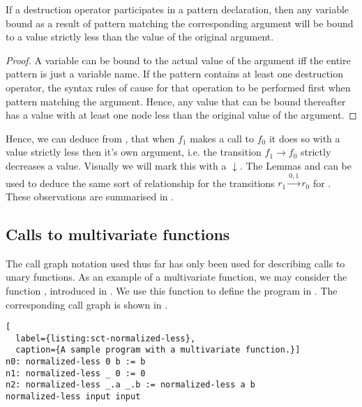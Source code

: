 \begin{lemma}\label{lemma:d-pattern-less} If a destruction operator
participates in a pattern declaration, then any variable bound as a result of
pattern matching the corresponding argument will be bound to a value strictly
less than the value of the original argument.\end{lemma}

\begin{proof} A variable can be bound to the actual value of the argument iff
the entire pattern is just a variable name. If the pattern contains at least
one destruction operator, the syntax rules of \D{} cause for that operation to
be performed first when pattern matching the argument. Hence, any value that
can be bound thereafter has a value with at least one node less than the
original value of the argument. \end{proof}

Hence, we can deduce from , that when $f_1$ makes a
call to $f_0$ it does so with a value strictly less then it's own argument,
i.e. the transition $f_1\rightarrow f_0$ strictly decreases a value. Visually
we will mark this with a $\downarrow$. The Lemmas 
and  can be used to deduce the same sort of
relationship for the transitions $r_1\xrightarrow{0,1} r_0$ for
. These observations are summarised in
.



\subsection{Calls to multivariate functions}

The call graph notation used thus far has only been used for describing calls
to unary functions. As an example of a multivariate function, we may consider
the function , introduced in
. We use this function to define the program in
. The corresponding call graph is shown in
.

\begin{lstlisting}[
  label={listing:sct-normalized-less},
  caption={A sample program with a multivariate function.}]
n0: normalized-less 0 b := b
n1: normalized-less _ 0 := 0
n2: normalized-less _.a _.b := normalized-less a b
normalized-less input input
\end{lstlisting}

